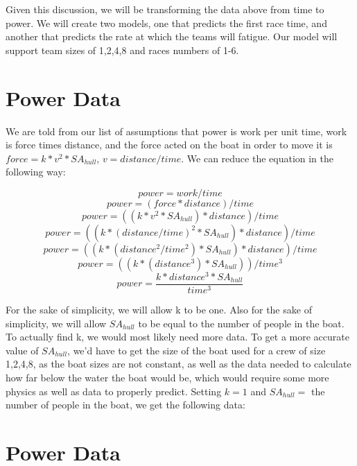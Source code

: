 \documentclass[12pt]{article} %
\begin{document}
Given this discussion, we will be transforming the data above from time to power. We will create two models, one that predicts the first race time, and another that predicts the rate at which the teams will fatigue. Our model will support team sizes of 1,2,4,8 and races numbers of 1-6.

\section*{Power Data}

We are told from our list of assumptions that power is work per unit time, work is force times distance, and the force acted on the boat in order to move it is $force = k*v^{2}*SA_{hull}$, $v = distance/time$. We can reduce the equation in the following way:

\[power = work/time\]
\[power = (force*distance)/time\]
\[power = ((k*v^{2}*SA_{hull})*distance)/time\]
\[power = ((k*(distance/time)^{2}*SA_{hull})*distance)/time\]
\[power = ((k*(distance^{2}/time^{2})*SA_{hull})*distance)/time\]
\[power = ((k*(distance^{3})*SA_{hull}))/time^{3}\]
\[power = \frac{k*distance^{3}*SA_{hull}}{time^{3}}\]

For the sake of simplicity, we will allow k to be one. Also for the sake of simplicity, we will allow $SA_{hull}$ to be equal to the number of people in the boat. To actually find k, we would most likely need more data. To get a more accurate value of $SA_{hull}$, we'd have to get the size of the boat used for a crew of size 1,2,4,8, as the boat sizes are not constant, as well as the data needed to calculate how far below the water the boat would be, which would require some more physics as well as data to properly predict. Setting $k=1$ and $SA_{hull} =$ the number of people in the boat, we get the following data:
\\
\section*{Power Data}
{\centering
{}
\\}
\end{document}
